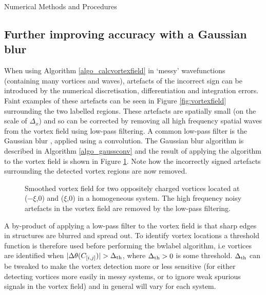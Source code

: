 \begin{chapter}{\label{cha:numerics}Numerical Methods and Procedures}
\subsection{\label{section:gaussianblur} Further improving accuracy with a Gaussian blur}
When using Algorithm \ref{algo_calcvortexfield} in `messy' wavefunctions (containing many vortices and waves), artefacts of the incorrect sign can be introduced by the numerical discretisation, differentiation and integration errors. Faint examples of these artefacts can be seen in Figure \ref{fig:vortexfield} surrounding the two labelled regions. These artefacts are spatially small (on the scale of $\Delta_x$) and so can be corrected by removing all high frequency spatial waves from the vortex field using low-pass filtering. A common low-pass filter is the Gaussian blur \cite{shapiro2001computer}, applied using a convolution. The Gaussian blur algorithm is described in Algorithm \ref{algo_gaussconv} and the result of applying the algorithm to the vortex field is shown in Figure \ref{fig:vortexfieldsmooth}. Note how the incorrectly signed artefacts surrounding the detected vortex regions are now removed.
\begin{figure}[!ht]
  \centering
  \caption{Smoothed vortex field for two oppositely charged vortices located at ($-\xi$,0) and ($\xi$,0) in a homogeneous system. The high frequency noisy artefacts in the vortex field are removed by the low-pass filtering.\label{fig:vortexfieldsmooth} }
 \end{figure}

A by-product of applying a low-pass filter to the vortex field is that sharp edges in structures are blurred and spread out. To identify vortex locations a threshold function is therefore used before performing the bwlabel algorithm, i.e vortices are identified when $|\Delta\theta(C_{[i,j]})| > \Delta_{\rm th}$, where $\Delta_{\rm th}>0$ is some threshold. $\Delta_{\rm th}$ can be tweaked to make the vortex detection more or less sensitive (for either detecting vortices more easily in messy systems, or to ignore weak spurious signals in the vortex field) and in general will vary for each system.

\end{chapter}
